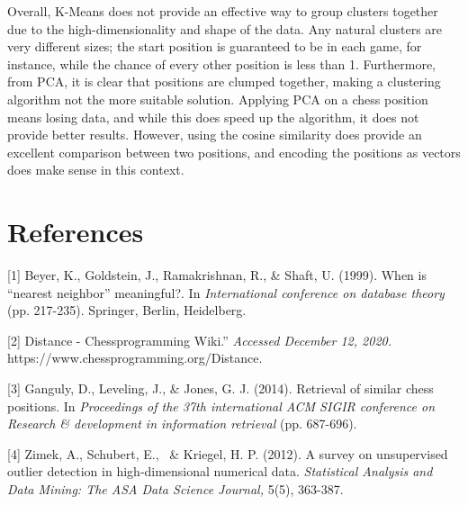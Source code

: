 \documentclass{article}
\begin{document}
Overall, K-Means does not provide an effective way to group clusters together due to the high-dimensionality and shape of the data. Any natural clusters are very different sizes; the start position is guaranteed to be in each game, for instance, while the chance of every other position is less than 1. Furthermore, from PCA, it is clear that positions are clumped together, making a clustering algorithm not the more suitable solution. Applying PCA on a chess position means losing data, and while this does speed up the algorithm, it does not provide better results. However, using the cosine similarity does provide an excellent comparison between two positions, and encoding the positions as vectors does make sense in this context.

\section*{References}

\medskip

\small

[1] Beyer, K., Goldstein, J., Ramakrishnan, R., & Shaft, U. (1999). When is “nearest neighbor” meaningful?. In {\it International conference on database theory} (pp. 217-235). Springer, Berlin, Heidelberg.

[2] Distance - Chessprogramming Wiki.” {\it Accessed December 12, 2020.} https://www.chessprogramming.org/Distance.

[3] Ganguly, D., Leveling, J., & Jones, G. J. (2014). Retrieval of similar chess positions. In {\it Proceedings of the 37th international ACM SIGIR conference on Research & development in information retrieval} (pp. 687-696).

[4] Zimek, A., Schubert, E., \ \& Kriegel, H. P. (2012). A survey on unsupervised outlier detection in high‐dimensional numerical data.  {\it Statistical Analysis and Data Mining: The ASA Data Science Journal,} 5(5), 363-387.
\end{document}

